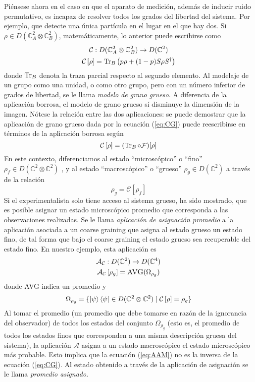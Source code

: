 \documentclass[onecolumn,11pt]{article}
\newcommand{\mcF}{\mathcal{F}}
\newcommand{\mcC}{\mathcal{C}}
\newcommand{\mcA}{\mathcal{A}}
\newcommand{\Complex}{\mathbb{C}} %
\newcommand{\CG}[1]{\mcC\left[#1\right]}
\begin{document}
Piénsese ahora en el caso en que el aparato de medición, además de inducir ruido permutativo, es incapaz de resolver todos los grados del libertad del sistema. Por ejemplo, que detecte una única partícula en el lugar en el que hay dos. Si $\rho\in D(\Complex^{2}_{A}\otimes\Complex^{2}_{B})$, matemáticamente, lo anterior puede escribirse como
\begin{gather}
\mcC:D(\Complex^{2}_{A}\otimes\Complex^{2}_{B})\rightarrow D(\Complex^{2})\label{eq:CGDom}\\
\mcC\left[\rho\right]=\Tr_{B}\left(p\rho+(1-p)S\rho S^{\dag}\right)\label{eq:CG}
\end{gather}
donde $\Tr_{B}$ denota la traza parcial respecto al segundo elemento. Al modelaje de un grupo como una unidad, o como otro grupo, pero con un número inferior de grados de libertad, se le llama \textit{modelo de grano grueso}. A diferencia de la aplicación borrosa, el modelo de grano grueso sí disminuye la dimensión de la imagen. Nótese la relación entre las dos aplicaciones: se puede demostrar\cite{FuzzyMeasurements} que la aplicación de grano grueso dada por la ecuación (\ref{eq:CG}) puede reescribirse en términos de la aplicación borrosa según
\begin{equation}
\CG{\rho}=(\Tr_{B}\circ\mcF)[\rho]
\end{equation}
En este contexto, diferenciamos al estado ``microscópico'' o ``fino'' $\rho_{f}\in D(\Complex^{2}\otimes\Complex^{2})$ , y al estado ``macroscópico'' o ``grueso'' $\rho_{g}\in D(\Complex^{2})$ a través de la relación
\begin{equation}
    \rho_{g}=\CG{\rho_{f}}
\end{equation}
Si el experimentalista solo tiene acceso al sistema grueso, ha sido mostrado\cite{Macro-To-Micro}, que es posible asignar un estado microscópico promedio que corresponda a las observaciones realizadas. Se le llama \textit{aplicación de asignación promedio} a la aplicación asociada a un coarse graining que asigna al estado grueso un estado fino, de tal forma que bajo el coarse graining el estado grueso sea recuperable del estado fino. En nuestro ejemplo, esta aplicación es
\begin{gather}
\mcA_{\mcC}:D(\Complex^{2})\rightarrow D(\Complex^{4})\label{eq:AAMDom}\\
\mcA_{\mcC}\left[\rho_{g}\right]=\textsc{AVG}(\Omega_{\rho_{g}})\label{eq:AAM}
\end{gather}
donde \textsc{AVG} indica un promedio y
\begin{equation}
\Omega_{\rho_{g}}=\{\ket{\psi}\bra{\psi}\in D(\Complex^{2}\otimes\Complex^{2}) \mid \CG{\rho}=\rho_{g}\}
\end{equation}
Al tomar el promedio (un promedio que debe tomarse en razón de la ignorancia del observador) de todos los estados del conjunto $\Omega_{\rho_{g}}$ (esto es, el promedio de todos los estados finos que corresponden a una misma descripción gruesa del sistema), la aplicación $\mcA$ asigna a un estado macroscópico el estado microscópico más probable. Esto implica que la ecuación (\ref{eq:AAM}) no es la inversa de la ecuación (\ref{eq:CG}). Al estado obtenido a través de la aplicación de asignación se le llama \textit{promedio asignado}.
\vspace{0.5cm}
\end{document}
